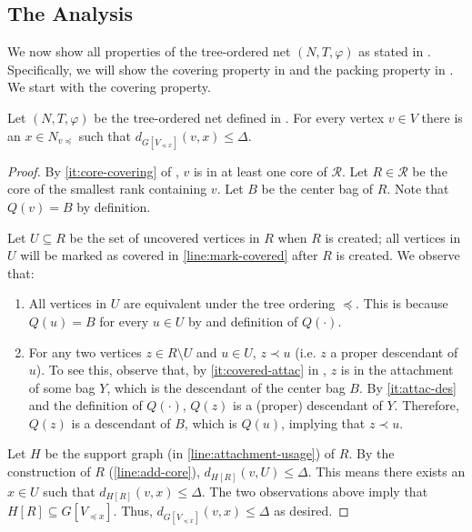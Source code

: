 \documentclass{theoretics}
\def\coreSet{\mathcal{R}}
\def\core{R}
\begin{document}
\subsection{The Analysis}


We now show all properties of the tree-ordered net $(N,T,\varphi)$ as stated in . Specifically, we will show the covering property in  and the packing property in . We start with the covering property.

\begin{lemma}
	\label{lem:covering}
	Let $(N,T,\varphi)$ be the tree-ordered net defined in .  For every vertex $v \in V$ there is an $x\in N_{v\preceq}$ such that $d_{G[V_{\preceq x}]}(v,x)\le \Delta$.
\end{lemma}
\begin{proof} By \cref{it:core-covering} of ,  $v$ is in at least one core of $\coreSet$.  Let $R \in \coreSet$ be the core of the smallest rank containing $v$. Let $B$ be the center bag of $R$. Note that $Q(v) = B$ by definition.
	
	Let $U\subseteq \core$ be the set of uncovered vertices in $\core$ when $R$ is created; all vertices in $U$ will be marked as covered in \cref{line:mark-covered} after $R$ is created.  We observe that:
	\begin{enumerate}
		\item All vertices in $U$ are equivalent under the tree ordering $\preceq$. This is because $Q(u)=B$ for every $u\in U$  by  and definition of $Q(\cdot)$.
		\item  For any two vertices $z\in R\setminus U$ and $u\in U$, $z \prec u$ (i.e. $z$ a proper descendant of $u$). To see this, observe that, by  \cref{it:covered-attac} in ,  $z$ is in the attachment of some bag $Y$, which is the descendant of the center bag $B$.   By \cref{it:attac-des} and the definition of $Q(\cdot)$, $Q(z)$ is a (proper) descendant of $Y$. Therefore, $Q(z)$ is a descendant of $B$, which is $Q(u)$, implying that $z\prec u$.
	\end{enumerate}
	Let $H$ be the support graph (in \cref{line:attachment-usage}) of $R$. By the construction of $\core$ (\cref{line:add-core}), $d_{H[R]}(v,U)\leq \Delta$.  This means there exists an $x\in U$ such that  $d_{H[R]}(v,x)\leq \Delta$. The two observations above imply that $H[R] \subseteq G[V_{\preceq x}]$. Thus, $d_{G[V_{\preceq x}]}(v,x)\leq \Delta$ as desired.       
\end{proof} 
\end{document}
